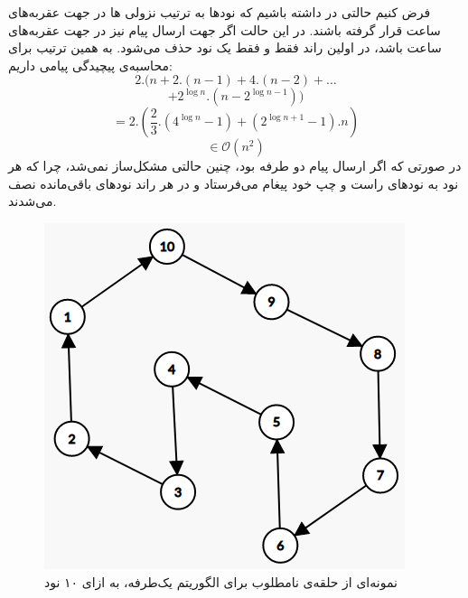 \documentclass{article}
\begin{document}
\begin{multicols}{2}
\subsubsection{}
فرض کنیم حالتی در 
داشته باشیم که نودها به ترتیب نزولی
ها در جهت عقربه‌های ساعت قرار گرفته باشند. در این حالت اگر جهت ارسال پیام نیز در جهت عقربه‌های ساعت باشد،
در اولین راند فقط و فقط یک نود حذف می‌شود. به همین ترتیب برای محاسبه‌ی پیچیدگی پیامی داریم:
$$2.(n + 2.(n-1) + 4.(n-2) + \dots$$
$$ + 2^{\log{n}}.(n-2^{\log{n}-1}))$$
$$=2.\left(\dfrac{2}{3}.(4^{\log{n}}-1) + (2^{\log{n}+1}-1).n\right)$$
$$\in \mathcal{O}(n^2)$$
در صورتی که اگر ارسال پیام دو طرفه بود، چنین حالتی مشکل‌ساز نمی‌شد، چرا که هر نود به نودهای راست و چپ خود پیغام می‌فرستاد و در هر راند نودهای باقی‌مانده نصف می‌شدند.
\begin{figure}[H]
    \centering
    \includegraphics[width=0.95\linewidth]{Photos/HW3/cycle.png}
    \caption{
    نمونه‌ای از حلقه‌ی نامطلوب برای الگوریتم
    یک‌طرفه، به ازای ۱۰ نود
    }
    \label{fig:my_label}
\end{figure}


\end{multicols}
\end{document}
